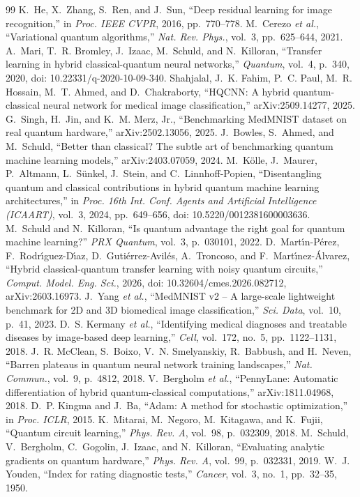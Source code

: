 \documentclass[conference]{IEEEtran}
\begin{document}
\begin{thebibliography}{99}
\footnotesize
{} K.~He, X.~Zhang, S.~Ren, and J.~Sun, ``Deep residual learning for image recognition,'' in \emph{Proc. IEEE CVPR}, 2016, pp.~770--778.
 M.~Cerezo \emph{et al.}, ``Variational quantum algorithms,'' \emph{Nat. Rev. Phys.}, vol.~3, pp.~625--644, 2021.
 A.~Mari, T.~R. Bromley, J.~Izaac, M.~Schuld, and N.~Killoran, ``Transfer learning in hybrid classical-quantum neural networks,'' \emph{Quantum}, vol.~4, p.~340, 2020, doi: 10.22331/q-2020-10-09-340.
 Shahjalal, J.~K. Fahim, P.~C. Paul, M.~R. Hossain, M.~T. Ahmed, and D.~Chakraborty, ``HQCNN: A hybrid quantum-classical neural network for medical image classification,'' arXiv:2509.14277, 2025.
 G.~Singh, H.~Jin, and K.~M. Merz, Jr., ``Benchmarking MedMNIST dataset on real quantum hardware,'' arXiv:2502.13056, 2025.
 J.~Bowles, S.~Ahmed, and M.~Schuld, ``Better than classical? The subtle art of benchmarking quantum machine learning models,'' arXiv:2403.07059, 2024.
 M.~K\"olle, J.~Maurer, P.~Altmann, L.~S\"unkel, J.~Stein, and C.~Linnhoff-Popien, ``Disentangling quantum and classical contributions in hybrid quantum machine learning architectures,'' in \emph{Proc. 16th Int. Conf. Agents and Artificial Intelligence (ICAART)}, vol.~3, 2024, pp.~649--656, doi: 10.5220/0012381600003636.
 M.~Schuld and N.~Killoran, ``Is quantum advantage the right goal for quantum machine learning?'' \emph{PRX Quantum}, vol.~3, p.~030101, 2022.
 D.~Mart\'{\i}n-P\'erez, F.~Rodr\'{\i}guez-D\'{\i}az, D.~Guti\'errez-Avil\'es, A.~Troncoso, and F.~Mart\'{\i}nez-\'Alvarez, ``Hybrid classical-quantum transfer learning with noisy quantum circuits,'' \emph{Comput. Model. Eng. Sci.}, 2026, doi: 10.32604/cmes.2026.082712, arXiv:2603.16973.
 J.~Yang \emph{et al.}, ``MedMNIST v2 -- A large-scale lightweight benchmark for 2D and 3D biomedical image classification,'' \emph{Sci. Data}, vol.~10, p.~41, 2023.
 D.~S. Kermany \emph{et al.}, ``Identifying medical diagnoses and treatable diseases by image-based deep learning,'' \emph{Cell}, vol.~172, no.~5, pp.~1122--1131, 2018.
 J.~R. McClean, S.~Boixo, V.~N. Smelyanskiy, R.~Babbush, and H.~Neven, ``Barren plateaus in quantum neural network training landscapes,'' \emph{Nat. Commun.}, vol.~9, p.~4812, 2018.
 V.~Bergholm \emph{et al.}, ``PennyLane: Automatic differentiation of hybrid quantum-classical computations,'' arXiv:1811.04968, 2018.
 D.~P. Kingma and J.~Ba, ``Adam: A method for stochastic optimization,'' in \emph{Proc. ICLR}, 2015.
 K.~Mitarai, M.~Negoro, M.~Kitagawa, and K.~Fujii, ``Quantum circuit learning,'' \emph{Phys. Rev. A}, vol.~98, p.~032309, 2018.
 M.~Schuld, V.~Bergholm, C.~Gogolin, J.~Izaac, and N.~Killoran, ``Evaluating analytic gradients on quantum hardware,'' \emph{Phys. Rev. A}, vol.~99, p.~032331, 2019.
 W.~J. Youden, ``Index for rating diagnostic tests,'' \emph{Cancer}, vol.~3, no.~1, pp.~32--35, 1950.
\end{thebibliography}
\end{document}
